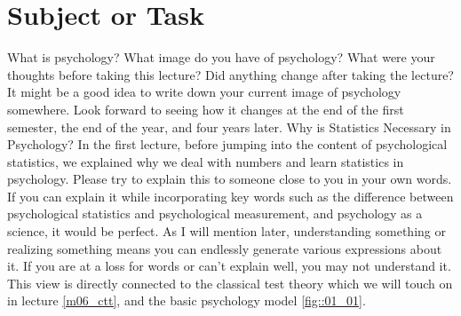 \documentclass{ltjsbook}
\begin{document}
\section{Subject or Task}
What is psychology?
What image do you have of psychology? What were your thoughts before taking this lecture? Did anything change after taking the lecture? It might be a good idea to write down your current image of psychology somewhere. Look forward to seeing how it changes at the end of the first semester, the end of the year, and four years later.
Why is Statistics Necessary in Psychology?
In the first lecture, before jumping into the content of psychological statistics, we explained why we deal with numbers and learn statistics in psychology. Please try to explain this to someone close to you in your own words. If you can explain it while incorporating key words such as the difference between psychological statistics and psychological measurement, and psychology as a science, it would be perfect. As I will mention later, understanding something or realizing something means you can endlessly generate various expressions about it. If you are at a loss for words or can't explain well, you may not understand it. This view is directly connected to the classical test theory which we will touch on in lecture \ref{m06_ctt}, and the basic psychology model \ref{fig::01_01}.
\end{document}

